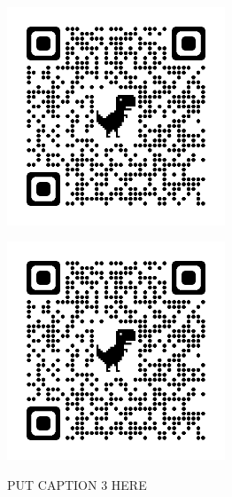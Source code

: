 \documentclass[a4paper,10pt]{article}
\begin{document}
\begin{center}
    \begin{minipage}{0.45\textwidth}
        \centering
        \includegraphics[width=6.5cm, height=6.5cm]{Figures/Apple.png}
        \label{fig:image5}
    \end{minipage}
    \hspace{0.05\textwidth}
    \begin{minipage}{0.45\textwidth}
        \centering
        \includegraphics[width=6.5cm, height=6.5cm]{Figures/Apple.png}
        \label{fig:image6}
    \end{minipage}
    PUT CAPTION 3 HERE

  \end{center}
\end{document}
